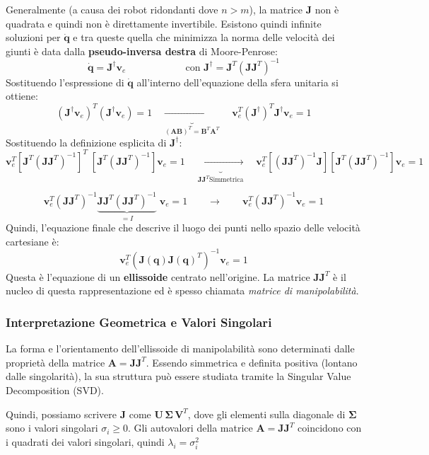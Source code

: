 \documentclass[11pt, a4paper]{report}
\begin{document}
Generalmente (a causa dei robot ridondanti dove $n > m$), la matrice $\bm{J}$ non è quadrata e quindi non è direttamente invertibile. Esistono quindi infinite soluzioni per $\dot{\bm{q}}$ e tra queste quella che minimizza la norma delle velocità dei giunti è data dalla \textbf{pseudo-inversa destra} di Moore-Penrose:
\[
    \dot{\bm{q}} = \bm{J}^\dagger \bm{v}_e \qquad \qquad \qquad \text{con } \bm{J}^\dagger = \bm{J}^T (\bm{J}\bm{J}^T)^{-1}
\]
Sostituendo l'espressione di $\dot{\bm{q}}$ all'interno dell'equazione della sfera unitaria si ottiene:
\[
    (\bm{J}^\dagger \bm{v}_e)^T (\bm{J}^\dagger \bm{v}_e) = 1 \quad\underbrace{\quad \longrightarrow \quad}_{(\bm{A}\bm{B})^T = \bm{B}^T\bm{A}^T} \quad \bm{v}_e^T (\bm{J}^\dagger)^T \bm{J}^\dagger \bm{v}_e = 1
\]
Sostituendo la definizione esplicita di $\bm{J}^\dagger$:
\[
    \bm{v}_e^T \left[ \bm{J}^T (\bm{J}\bm{J}^T)^{-1} \right]^{T} \; \left[ \bm{J}^T (\bm{J}\bm{J}^T)^{-1} \right] \bm{v}_e = 1 \quad\underbrace{\quad \longrightarrow \quad}_{\bm{J}\bm{J}^T \text{Simmetrica}} \quad \bm{v}_e^T \left[ (\bm{J}\bm{J}^T)^{-1}\bm{J} \right] \left[ \bm{J}^T (\bm{J}\bm{J}^T)^{-1} \right] \bm{v}_e = 1
\]

\[
    \bm{v}_e^T (\bm{J}\bm{J}^T)^{-1} \underbrace{\bm{J} \bm{J}^T (\bm{J}\bm{J}^T)^{-1}}_{= I} \; \bm{v}_e = 1 \qquad \longrightarrow \qquad \bm{v}_e^T (\bm{J}\bm{J}^T)^{-1} \bm{v}_e = 1
\]
Quindi, l'equazione finale che descrive il luogo dei punti nello spazio delle velocità cartesiane è:
\[
    \bm{v}_e^T \left( \bm{J}(\bm{q})\bm{J}(\bm{q})^T \right)^{-1} \bm{v}_e = 1
\]
Questa è l'equazione di un \textbf{ellissoide} centrato nell'origine. La matrice $\bm{J}\bm{J}^T$ è il nucleo di questa rappresentazione ed è spesso chiamata \emph{matrice di manipolabilità}.

\subsubsection{Interpretazione Geometrica e Valori Singolari}
La forma e l'orientamento dell'ellissoide di manipolabilità sono determinati dalle proprietà della matrice \(\mathbf{A} = \mathbf{J}\mathbf{J}^T\). Essendo simmetrica e definita positiva (lontano dalle singolarità), la sua struttura può essere studiata tramite la Singular Value Decomposition (SVD).

Quindi, possiamo scrivere \(\mathbf{J} \) come \(\mathbf{U}\,\mathbf{\Sigma}\,\mathbf{V}^T\), dove gli elementi sulla diagonale  di \(\mathbf{\Sigma}\) sono i valori singolari \(\sigma_i \ge 0\). Gli autovalori della matrice \(\mathbf{A} = \mathbf{J}\mathbf{J}^T\) coincidono con i quadrati dei valori singolari, quindi \(\lambda_i = \sigma_i^2\)
\end{document}
